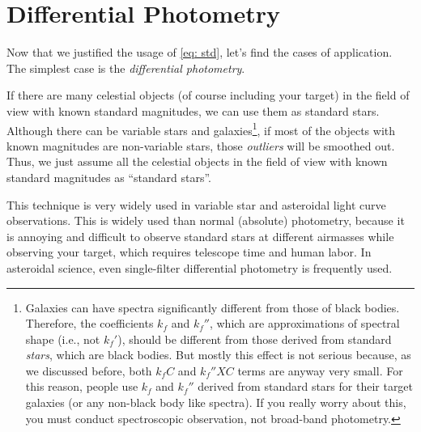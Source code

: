 \section{Differential Photometry}
Now that we justified the usage of \cref{eq: std}, let's find the cases of application. The simplest case is the \textit{differential photometry}. 

If there are many celestial objects (of course including your target) in the field of view with known standard magnitudes, we can use them as standard stars. Although there can be variable stars and galaxies\footnote{Galaxies can have spectra significantly different from those of black bodies. Therefore, the coefficients $ k_f $ and $ k_f'' $, which are approximations of spectral shape (i.e., not $ k_f' $), should be different from those derived from standard \textit{stars}, which are black bodies. But mostly this effect is not serious because, as we discussed before, both $ k_f C $ and $ k_f'' X C $ terms are anyway very small. For this reason, people use $ k_f $ and $ k_f'' $ derived from standard stars for their target galaxies (or any non-black body like spectra). If you really worry about this, you must conduct spectroscopic observation, not broad-band photometry.}, if most of the objects with known magnitudes are non-variable stars, those \textit{outliers} will be smoothed out. Thus, we just assume all the celestial objects in the field of view with known standard magnitudes as ``standard stars''. 

This technique is very widely used in variable star and asteroidal light curve observations. This is widely used than normal (absolute) photometry, because it is annoying and difficult to observe standard stars at different airmasses while observing your target, which requires telescope time and human labor. In asteroidal science, even single-filter differential photometry is frequently used. 


